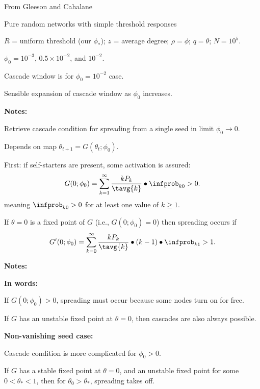 \begin{frame}[plain]
    {\small From Gleeson and Cahalane\cite{gleeson2007a}}
    
    
     
      Pure random networks with simple threshold responses
     
      $R$ = uniform threshold (our $\phi_\ast$);
      $z$ = average degree; $\rho = \phi$; $q = \theta$; $N=10^5$.
     
      $\phi_0 = 10^{-3}$, $0.5 \times 10^{-2}$,
      and 
      $10^{-2}$.
    
      Cascade window is for $\phi_0 = 10^{-2}$ case.
    
      Sensible expansion of cascade window as $\phi_0$ increases.
    
  
  \textbf{Notes:}

    
    
      Retrieve cascade condition for 
      spreading from a single seed in limit $\phi_0 \rightarrow 0$.
     
      Depends on map $\theta_{t+1} = G(\theta_{t};\phi_0)$.
     
      First: if self-starters are present, some activation is assured:
      $$
      G(0;\phi_0) = 
      \sum_{k=1}^{\infty} 
      \frac{kP_k}{\tavg{k}}
      \bullet
      \infprob_{k0} > 0.
      $$
      meaning $\infprob_{k0}>0$ for at least one value of $k \ge 1$.
     
      If $\theta=0$ is a fixed point of $G$ (i.e., $G(0;\phi_0) = 0$)
      then spreading occurs if
      $$
      G'(0;\phi_0) = 
      \sum_{k=0}^{\infty} 
      \frac{k P_k}{\tavg{k}}
      \bullet
      (k-1) 
      \bullet
      \infprob_{k1} > 1.
      $$
    

  \textbf{Notes:}

  \textbf{In words:}    
    
     
      If $G(0;\phi_0) > 0$, spreading must occur because
      some nodes turn on for free.
     
      If $G$ has an \alert{unstable fixed point} at $\theta = 0$,
      then cascades are also always possible.
    
  

  \textbf{Non-vanishing seed case:}
    
     
      Cascade condition is more complicated for
      $\phi_0 > 0$.
     
      If $G$ has a \alert{stable fixed point} at $\theta = 0$,
      and an \alert{unstable fixed point} for some $0 < \theta_\ast < 1$,
      then for $\theta_0  > \theta_\ast$, spreading takes off.
    

\end{frame}
